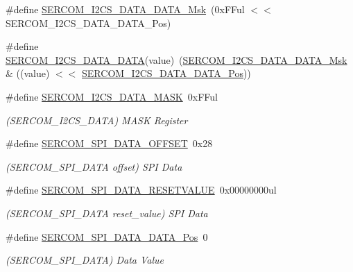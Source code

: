 \begin{DoxyCompactItemize}
\#define \mbox{\hyperlink{group___s_a_m_d21___s_e_r_c_o_m_ga262933e700d7da8d9906ddced37c53f4}{S\+E\+R\+C\+O\+M\+\_\+\+I2\+C\+S\+\_\+\+D\+A\+T\+A\+\_\+\+D\+A\+T\+A\+\_\+\+Msk}}~(0x\+F\+Ful $<$$<$ S\+E\+R\+C\+O\+M\+\_\+\+I2\+C\+S\+\_\+\+D\+A\+T\+A\+\_\+\+D\+A\+T\+A\+\_\+\+Pos)
\item 
\#define \mbox{\hyperlink{group___s_a_m_d21___s_e_r_c_o_m_ga44f2a2dfe8e1dc25c8922214037a1df1}{S\+E\+R\+C\+O\+M\+\_\+\+I2\+C\+S\+\_\+\+D\+A\+T\+A\+\_\+\+D\+A\+TA}}(value)~(\mbox{\hyperlink{group___s_a_m_d21___s_e_r_c_o_m_ga262933e700d7da8d9906ddced37c53f4}{S\+E\+R\+C\+O\+M\+\_\+\+I2\+C\+S\+\_\+\+D\+A\+T\+A\+\_\+\+D\+A\+T\+A\+\_\+\+Msk}} \& ((value) $<$$<$ \mbox{\hyperlink{group___s_a_m_d21___s_e_r_c_o_m_ga12ba9b88b0fe76770dd6a570d48e1f8b}{S\+E\+R\+C\+O\+M\+\_\+\+I2\+C\+S\+\_\+\+D\+A\+T\+A\+\_\+\+D\+A\+T\+A\+\_\+\+Pos}}))
\item 
\#define \mbox{\hyperlink{group___s_a_m_d21___s_e_r_c_o_m_ga098e910db8ca0b69739485372339182a}{S\+E\+R\+C\+O\+M\+\_\+\+I2\+C\+S\+\_\+\+D\+A\+T\+A\+\_\+\+M\+A\+SK}}~0x\+F\+Ful
\begin{DoxyCompactList}\small\item\em (S\+E\+R\+C\+O\+M\+\_\+\+I2\+C\+S\+\_\+\+D\+A\+TA) M\+A\+SK Register \end{DoxyCompactList}\item 
\#define \mbox{\hyperlink{group___s_a_m_d21___s_e_r_c_o_m_ga83e4bab525aa946375107f1a0d894377}{S\+E\+R\+C\+O\+M\+\_\+\+S\+P\+I\+\_\+\+D\+A\+T\+A\+\_\+\+O\+F\+F\+S\+ET}}~0x28
\begin{DoxyCompactList}\small\item\em (S\+E\+R\+C\+O\+M\+\_\+\+S\+P\+I\+\_\+\+D\+A\+TA offset) S\+PI Data \end{DoxyCompactList}\item 
\#define \mbox{\hyperlink{group___s_a_m_d21___s_e_r_c_o_m_gacdd8d48701fa491da211f522e4dc1f0e}{S\+E\+R\+C\+O\+M\+\_\+\+S\+P\+I\+\_\+\+D\+A\+T\+A\+\_\+\+R\+E\+S\+E\+T\+V\+A\+L\+UE}}~0x00000000ul
\begin{DoxyCompactList}\small\item\em (S\+E\+R\+C\+O\+M\+\_\+\+S\+P\+I\+\_\+\+D\+A\+TA reset\+\_\+value) S\+PI Data \end{DoxyCompactList}\item 
\#define \mbox{\hyperlink{group___s_a_m_d21___s_e_r_c_o_m_ga2bc3a8d8660c1c7eaf18928fb7214cf3}{S\+E\+R\+C\+O\+M\+\_\+\+S\+P\+I\+\_\+\+D\+A\+T\+A\+\_\+\+D\+A\+T\+A\+\_\+\+Pos}}~0
\begin{DoxyCompactList}\small\item\em (S\+E\+R\+C\+O\+M\+\_\+\+S\+P\+I\+\_\+\+D\+A\+TA) Data Value \end{DoxyCompactList}\item 

\end{DoxyCompactItemize}
